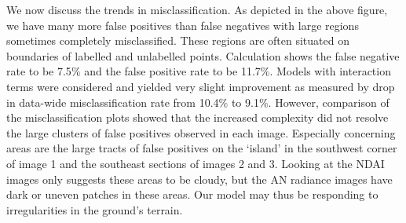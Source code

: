 \documentclass{article}\usepackage[]{graphicx}\usepackage[]{color}
\begin{document}
We now discuss the trends in misclassification. As depicted in the above figure, we have many more false positives than false negatives with large regions sometimes completely misclassified. These regions are often situated on boundaries of labelled and unlabelled points. Calculation shows the false negative rate to be 7.5$\%$ and the false positive rate to be 11.7$\%$. Models with interaction terms were considered and yielded very slight improvement as measured by drop in data-wide misclassification rate from 10.4$\%$ to 9.1$\%$. However, comparison of the misclassification plots showed that the increased complexity did not resolve the large clusters of false positives observed in each image. Especially concerning areas are the large tracts of false positives on the `island' in the southwest corner of image 1 and the southeast sections of images 2 and 3. Looking at the NDAI images only suggests these areas to be cloudy, but the AN radiance images have dark or uneven patches in these areas. Our model may thus be responding to irregularities in the ground's terrain.
\end{document}

